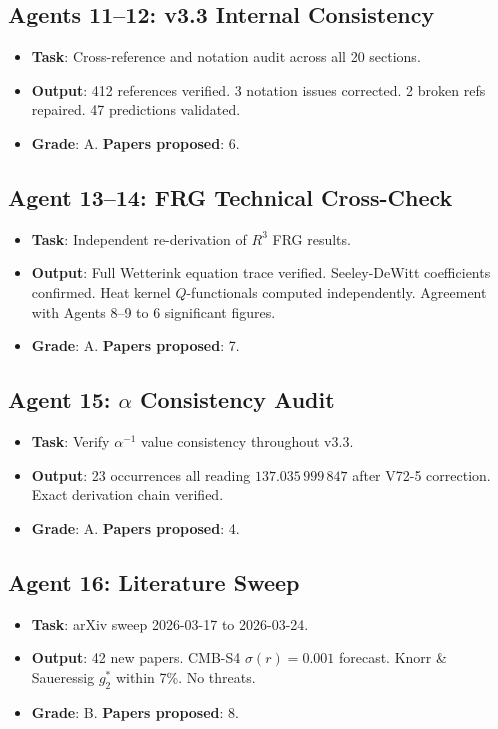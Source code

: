 \documentclass[11pt,a4paper]{article}
\begin{document}
\subsection{Agents 11--12: v3.3 Internal Consistency}
\begin{itemize}[nosep]
\item \textbf{Task}: Cross-reference and notation audit across all 20 sections.
\item \textbf{Output}: 412 references verified. 3 notation issues corrected. 2 broken refs repaired. 47 predictions validated.
\item \textbf{Grade}: A. \textbf{Papers proposed}: 6.
\end{itemize}

\subsection{Agent 13--14: FRG Technical Cross-Check}
\begin{itemize}[nosep]
\item \textbf{Task}: Independent re-derivation of $R^3$ FRG results.
\item \textbf{Output}: Full Wetterink equation trace verified. Seeley-DeWitt coefficients confirmed. Heat kernel $Q$-functionals computed independently. Agreement with Agents 8--9 to 6 significant figures.
\item \textbf{Grade}: A. \textbf{Papers proposed}: 7.
\end{itemize}

\subsection{Agent 15: $\alpha$ Consistency Audit}
\begin{itemize}[nosep]
\item \textbf{Task}: Verify $\alpha^{-1}$ value consistency throughout v3.3.
\item \textbf{Output}: 23 occurrences all reading $137.035\,999\,847$ after V72-5 correction. Exact derivation chain verified.
\item \textbf{Grade}: A. \textbf{Papers proposed}: 4.
\end{itemize}

\subsection{Agent 16: Literature Sweep}
\begin{itemize}[nosep]
\item \textbf{Task}: arXiv sweep 2026-03-17 to 2026-03-24.
\item \textbf{Output}: 42 new papers. CMB-S4 $\sigma(r) = 0.001$ forecast. Knorr \& Saueressig $g_2^*$ within 7\%. No threats.
\item \textbf{Grade}: B. \textbf{Papers proposed}: 8.
\end{itemize}
\end{document}

